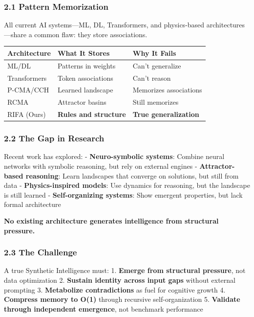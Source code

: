 \documentclass[
  11pt,
  a4paper,
]{article}
\begin{document}
\subsubsection{2.1 Pattern Memorization}\label{pattern-memorization}

All current AI systems---ML, DL, Transformers, and physics-based
architectures---share a common flaw: they store associations.

\begin{longtable}[]{@{}lll@{}}
\toprule\noalign{}
Architecture & What It Stores & Why It Fails \\
\midrule\noalign{}
\endhead
\bottomrule\noalign{}
\endlastfoot
ML/DL & Patterns in weights & Can't generalize \\
Transformers & Token associations & Can't reason \\
P-CMA/CCH & Learned landscape & Memorizes associations \\
RCMA & Attractor basins & Still memorizes \\
RIFA (Ours) & \textbf{Rules and structure} & \textbf{True
generalization} \\
\end{longtable}

\subsubsection{2.2 The Gap in Research}\label{the-gap-in-research}

Recent work has explored: - \textbf{Neuro-symbolic systems}: Combine
neural networks with symbolic reasoning, but rely on external engines -
\textbf{Attractor-based reasoning}: Learn landscapes that converge on
solutions, but still from data - \textbf{Physics-inspired models}: Use
dynamics for reasoning, but the landscape is still learned -
\textbf{Self-organizing systems}: Show emergent properties, but lack
formal architecture

\textbf{No existing architecture generates intelligence from structural
pressure.}

\subsubsection{2.3 The Challenge}\label{the-challenge}

A true Synthetic Intelligence must: 1. \textbf{Emerge from structural
pressure}, not data optimization 2. \textbf{Sustain identity across
input gaps} without external prompting 3. \textbf{Metabolize
contradictions} as fuel for cognitive growth 4. \textbf{Compress memory
to O(1)} through recursive self-organization 5. \textbf{Validate through
independent emergence}, not benchmark performance
\end{document}
